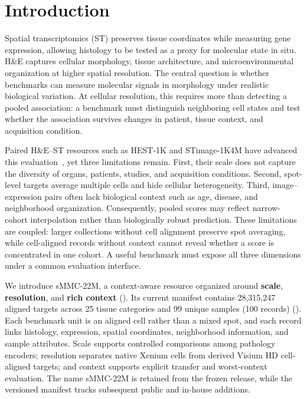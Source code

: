 \documentclass[sigconf,review]{acmart}
\newcommand{\dataset}{sMMC-22M\xspace}
\begin{document}
\section{Introduction}
Spatial transcriptomics (ST) preserves tissue coordinates while measuring gene
expression, allowing histology to be tested as a proxy for molecular state in
situ. H\&E captures cellular morphology, tissue architecture, and
microenvironmental organization at higher spatial resolution. The central
question is whether benchmarks can measure molecular signals in morphology
under realistic biological variation. At cellular resolution, this requires more
than detecting a pooled association: a benchmark must distinguish neighboring
cell states and test whether the association survives changes in patient,
tissue context, and acquisition condition.

Paired H\&E--ST resources such as HEST-1K and STimage-1K4M have advanced this
evaluation~\cite{jaume2025hest,chen2024stimage}, yet three limitations remain.
First, their scale does not capture the diversity of organs, patients, studies,
and acquisition conditions. Second, spot-level targets average multiple cells
and hide cellular heterogeneity. Third, image--expression pairs often lack
biological context such as age, disease, and neighborhood organization.
Consequently, pooled scores may reflect narrow-cohort interpolation rather than
biologically robust prediction. These limitations are coupled: larger
collections without cell alignment preserve spot averaging, while cell-aligned
records without context cannot reveal whether a score is concentrated in one
cohort. A useful benchmark must expose all three dimensions under a common
evaluation interface.

We introduce \dataset, a context-aware resource organized around
\textbf{scale}, \textbf{resolution}, and \textbf{rich context}
(). Its current manifest contains 28{,}315{,}247
aligned targets across 25 tissue categories and 99 unique samples (100 records)
(). Each benchmark unit is an aligned cell
rather than a mixed spot, and each record links histology, expression, spatial
coordinates, neighborhood information, and sample attributes. Scale supports
controlled comparisons among pathology encoders; resolution separates native
Xenium cells from derived Visium HD cell-aligned targets; and context supports
explicit transfer and worst-context evaluation. The name
\dataset is retained from the frozen release, while the versioned manifest
tracks subsequent public and in-house additions.
\end{document}
